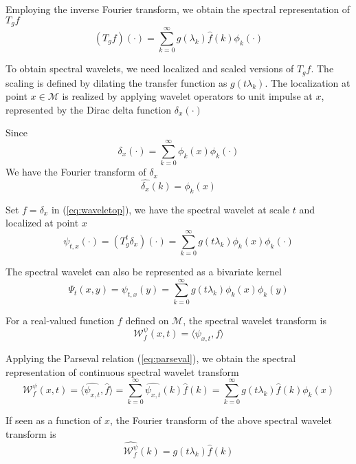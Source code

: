 Employing the inverse Fourier transform, we obtain the spectral representation of $T_g f$
\begin{equation}
\label{eq:waveletop}
(T_g f)(\cdot)=\sum_{k=0}^\infty g(\lambda_k)\hat{f}(k)\phi_k(\cdot)
\end{equation}

To obtain spectral wavelets, we need localized and scaled versions of $T_g f$. The scaling is defined by dilating the transfer function as $g(t\lambda_k)$. The localization at point $x\in\mathcal{M}$ is realized by applying wavelet operators to unit impulse at $x$, represented by the Dirac delta function $\delta_x(\cdot)$

Since
\begin{equation}
\delta_x(\cdot)=\sum_{k=0}^\infty\phi_k(x)\phi_k(\cdot)
\end{equation}
We have the Fourier transform of $\delta_x$
\begin{equation}
\hat{\delta_x}(k)=\phi_k(x)
\end{equation}

Set $f=\delta_x$ in (\ref{eq:waveletop}), we have the spectral wavelet at scale $t$ and localized at point $x$
\begin{equation}
\psi_{t,x}(\cdot)=(T^t_g\delta_x)(\cdot)=\sum_{k=0}^\infty g(t\lambda_k)\phi_k(x)\phi_k(\cdot)
\end{equation}

The spectral wavelet can also be represented as a bivariate kernel
\begin{equation}
\Psi_t(x,y)=\psi_{t,x}(y)=\sum_{k=0}^\infty g(t\lambda_k)\phi_k(x)\phi_k(y)
\end{equation}

For a real-valued function $f$ defined on $\mathcal{M}$, the spectral wavelet transform is
\begin{equation}
\mathcal{W}^\psi_f(x,t)=\langle\psi_{x,t},f\rangle
\end{equation}

Applying the Parseval relation (\ref{eq:parseval}), we obtain the spectral representation of continuous spectral wavelet transform
\begin{equation}
\mathcal{W}^\psi_f(x,t)=\langle\hat{\psi_{x,t}},\hat{f}\rangle=\sum_{k=0}^\infty\hat{\psi_{x,t}}(k)\hat{f}(k)=\sum_{k=0}^\infty g(t\lambda_k)\hat{f}(k)\phi_k(x)
\end{equation}

If seen as a function of $x$, the Fourier transform of the above spectral wavelet transform is
\begin{equation}
\widehat{\mathcal{W}^\psi_f}(k)=g(t\lambda_k)\hat{f}(k)
\end{equation}


